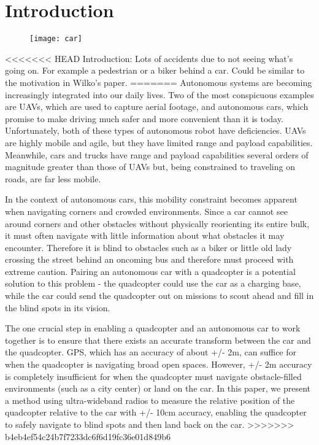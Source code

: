 
\section{Introduction}

\begin{figure}
    \centering

    \texttt{[image: car]}

\end{figure}

<<<<<<< HEAD
Introduction: Lots of accidents due to not seeing what's going on. For example a pedestrian or a biker behind a car. Could be similar to the motivation in Wilko's paper.
=======
Autonomous systems are becoming increasingly integrated into
our daily lives. Two of the most conspicuous examples are UAVs,
which are used to capture aerial footage, and autonomous cars,
which promise to make driving much safer and more convenient
than it is today. Unfortunately, both of these types of autonomous
robot have deficiencies. UAVs are highly mobile and agile, but they
have limited range and payload capabilities. Meanwhile, cars and trucks
have range and payload capabilities several orders of magnitude greater than
those of UAVs but, being constrained to traveling on roads, are far less mobile.

In the context of autonomous cars, this mobility constraint becomes apparent
when navigating corners and crowded environments. Since a car cannot
see around corners and other obstacles without physically reorienting its
entire bulk, it must often navigate with little information about what obstacles
it may encounter. Therefore it is blind to obstacles such as a biker or little old
lady crossing the street behind an oncoming bus and therefore must proceed
with extreme caution. Pairing an autonomous car with a quadcopter is a potential
solution to this problem - the quadcopter could use the car as a charging base,
while the car could send the quadcopter out on missions to scout ahead and
fill in the blind spots in its vision.

The one crucial step in enabling a quadcopter and an autonomous car to work
together is to ensure that there exists an accurate transform between the car
and the quadcopter. GPS, which has an accuracy of about +/- 2m, can suffice
for when the quadcopter is navigating broad open spaces. However, +/- 2m
accuracy is completely insufficient for when the quadcopter must navigate
obstacle-filled environments (such as a city center) or land on the car. In this 
paper, we present a method using ultra-wideband radios to measure the relative 
position of the quadcopter relative to the car with +/- 10cm accuracy, enabling 
the quadcopter to safely navigate to blind spots and then land back on the car.
>>>>>>> b4eb4ef54c24b7f7233dc6f6d19fc36e01d849b6

